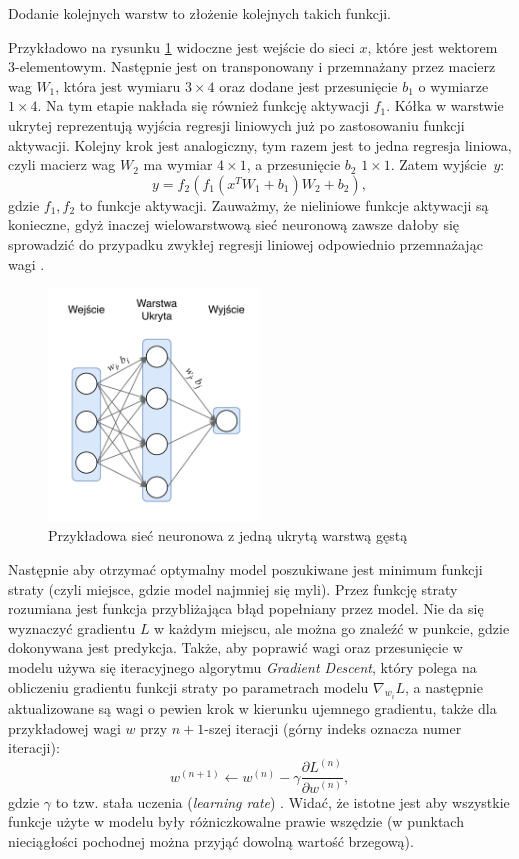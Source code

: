 \documentclass{pracalicmgr}
\begin{document}
	Dodanie kolejnych warstw to złożenie kolejnych takich funkcji.
	
	 Przykładowo na rysunku \ref{fig:simple} widoczne jest wejście do sieci $x$, które jest wektorem 3-elementowym. Następnie jest on transponowany i przemnażany przez macierz wag $W_1$, która jest wymiaru $3\times4$ oraz dodane jest przesunięcie $b_1$ o wymiarze $1\times4$. Na tym etapie nakłada się również funkcję aktywacji $f_1$. Kółka w warstwie ukrytej reprezentują wyjścia regresji liniowych już po zastosowaniu funkcji aktywacji. Kolejny krok jest analogiczny, tym razem jest to jedna regresja liniowa, czyli macierz wag $W_2$ ma wymiar $4\times1$, a przesunięcie $b_2$ $1\times1$. Zatem wyjście~$y$: $$y = f_2(f_1(x^TW_1 + b_1)W_2 + b_2),$$ gdzie $f_1, f_2$ to funkcje aktywacji. Zauważmy, że nieliniowe funkcje aktywacji są konieczne, gdyż inaczej wielowarstwową sieć neuronową zawsze dałoby się sprowadzić do przypadku zwykłej regresji liniowej odpowiednio przemnażając wagi \cite{dl}.
	
	\begin{figure}[H]
	\centering
	\includegraphics[width=0.5\textwidth]{simple_nn.pdf}
	\caption{Przykładowa sieć neuronowa z jedną ukrytą warstwą gęstą}
	\label{fig:simple}
	\end{figure}
	
	Następnie aby otrzymać optymalny model poszukiwane jest minimum funkcji straty (czyli miejsce, gdzie model najmniej się myli). Przez funkcję straty rozumiana jest funkcja przybliżająca błąd popełniany przez model. Nie da się wyznaczyć gradientu $L$ w każdym miejscu, ale można go znaleźć w punkcie, gdzie dokonywana jest predykcja. Także, aby poprawić wagi oraz przesunięcie w modelu używa się iteracyjnego algorytmu \textit{Gradient Descent}, który polega na obliczeniu gradientu funkcji straty po parametrach modelu $\nabla_{w_i}L$, a następnie aktualizowane są wagi o pewien krok w kierunku ujemnego gradientu, także dla przykładowej wagi $w$ przy $n+1$-szej iteracji (górny indeks oznacza numer iteracji): $$w^{(n+1)} \leftarrow w^{(n)} - \gamma \frac{\partial L^{(n)}}{\partial w^{(n)}},$$ gdzie $\gamma$ to tzw. stała uczenia (\textit{learning rate}) \cite{dl}. Widać, że istotne jest aby wszystkie funkcje użyte w modelu były różniczkowalne prawie wszędzie (w punktach nieciągłości pochodnej można przyjąć dowolną wartość brzegową). 
\end{document}
